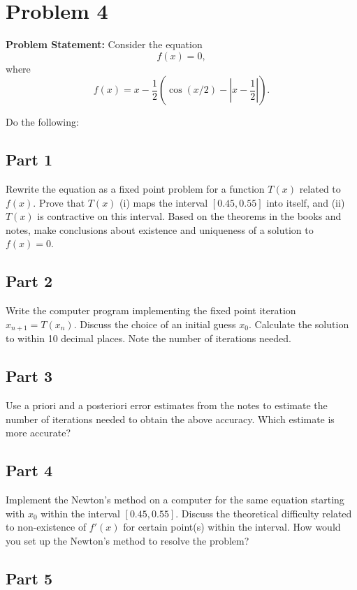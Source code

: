 \clearpage
\section*{Problem 4}

\textbf{Problem Statement:} Consider the equation
$$f(x) = 0,$$
where
$$f(x) = x - \frac{1}{2}\left(\cos(x/2) - \left|x - \frac{1}{2}\right|\right).$$

Do the following:

\subsection*{Part 1}

Rewrite the equation as a fixed point problem for a function $T(x)$ related to $f(x)$. Prove that $T(x)$ (i) maps the interval $[0.45, 0.55]$ into itself, and (ii) $T(x)$ is contractive on this interval. Based on the theorems in the books and notes, make conclusions about existence and uniqueness of a solution to $f(x) = 0$.

\subsection*{Part 2}

Write the computer program implementing the fixed point iteration $x_{n+1} = T(x_n)$. Discuss the choice of an initial guess $x_0$. Calculate the solution to within 10 decimal places. Note the number of iterations needed.

\subsection*{Part 3}

Use a priori and a posteriori error estimates from the notes to estimate the number of iterations needed to obtain the above accuracy. Which estimate is more accurate?

\subsection*{Part 4}

Implement the Newton's method on a computer for the same equation starting with $x_0$ within the interval $[0.45, 0.55]$. Discuss the theoretical difficulty related to non-existence of $f'(x)$ for certain point(s) within the interval. How would you set up the Newton's method to resolve the problem?

\subsection*{Part 5}

